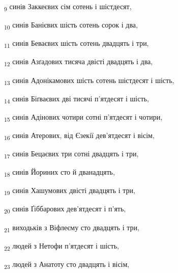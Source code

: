 \begin{tcolorbox}
\textsubscript{9} синів Заккеєвих сім сотень і шістдесят,
\end{tcolorbox}
\begin{tcolorbox}
\textsubscript{10} синів Банієвих шість сотень сорок і два,
\end{tcolorbox}
\begin{tcolorbox}
\textsubscript{11} синів Беваєвих шість сотень двадцять і три,
\end{tcolorbox}
\begin{tcolorbox}
\textsubscript{12} синів Азґадових тисяча двісті двадцять і два,
\end{tcolorbox}
\begin{tcolorbox}
\textsubscript{13} синів Адонікамових шість сотень шістдесят і шість,
\end{tcolorbox}
\begin{tcolorbox}
\textsubscript{14} синів Біґваєвих дві тисячі п'ятдесят і шість,
\end{tcolorbox}
\begin{tcolorbox}
\textsubscript{15} синів Адінових чотири сотні п'ятдесят і чотири,
\end{tcolorbox}
\begin{tcolorbox}
\textsubscript{16} синів Атерових, від Єзекії дев'ятдесят і вісім,
\end{tcolorbox}
\begin{tcolorbox}
\textsubscript{17} синів Бецаєвих три сотні двадцять і три,
\end{tcolorbox}
\begin{tcolorbox}
\textsubscript{18} синів Йориних сто й дванадцять,
\end{tcolorbox}
\begin{tcolorbox}
\textsubscript{19} синів Хашумових двісті двадцять і три,
\end{tcolorbox}
\begin{tcolorbox}
\textsubscript{20} синів Ґіббарових дев'ятдесят і п'ять,
\end{tcolorbox}
\begin{tcolorbox}
\textsubscript{21} виходьків з Віфлеєму сто двадцять і три,
\end{tcolorbox}
\begin{tcolorbox}
\textsubscript{22} людей з Нетофи п'ятдесят і шість,
\end{tcolorbox}
\begin{tcolorbox}
\textsubscript{23} людей з Анатоту сто двадцять і вісім,
\end{tcolorbox}
